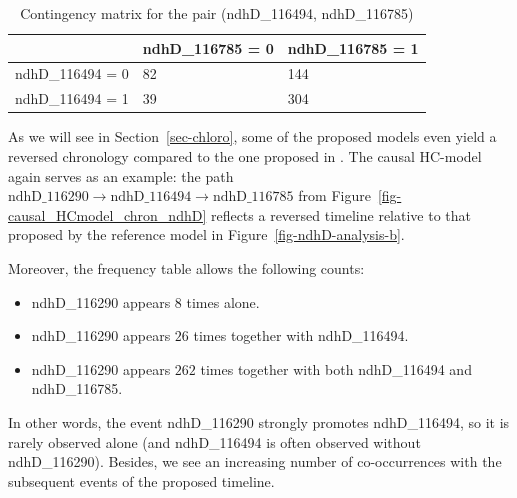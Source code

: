 \documentclass[
]{article}
\providecommand{\tightlist}{%
  \setlength{\itemsep}{0pt}\setlength{\parskip}{0pt}}\usepackage{longtable,booktabs,array}
\theoremstyle{definition}
\theoremstyle{remark}
\begin{document}
\begin{longtable}[]{@{}lll@{}}

\caption{\label{tbl-contigency_ed40_ed41}Contingency matrix for the pair
(ndhD\_116494, ndhD\_116785)}

\tabularnewline

\toprule\noalign{}
& ndhD\_116785 = 0 & ndhD\_116785 = 1 \\
\midrule\noalign{}
\endhead
\bottomrule\noalign{}
\endlastfoot
ndhD\_116494 = 0 & 82 & 144 \\
ndhD\_116494 = 1 & 39 & 304 \\

\end{longtable}

As we will see in Section~\ref{sec-chloro}, some of the proposed models
even yield a reversed chronology compared to the one proposed in
. The causal HC-model
again serves as an example: the path
\(\text{ndhD\_116290}\longrightarrow\text{ndhD\_116494}\longrightarrow \text{ndhD\_116785}\)
from Figure~\ref{fig-causal_HCmodel_chron_ndhD} reflects a reversed
timeline relative to that proposed by the reference model in
Figure~\ref{fig-ndhD-analysis-b}.

Moreover, the frequency table allows the following counts:

\begin{itemize}
\tightlist
\item
  ndhD\_116290 appears \(8\) times alone.
\item
  ndhD\_116290 appears \(26\) times together with ndhD\_116494.
\item
  ndhD\_116290 appears \(262\) times together with both ndhD\_116494 and
  ndhD\_116785.
\end{itemize}

In other words, the event ndhD\_116290 strongly promotes ndhD\_116494,
so it is rarely observed alone (and ndhD\_116494 is often observed
without ndhD\_116290). Besides, we see an increasing number of
co-occurrences with the subsequent events of the proposed timeline.
\end{document}

